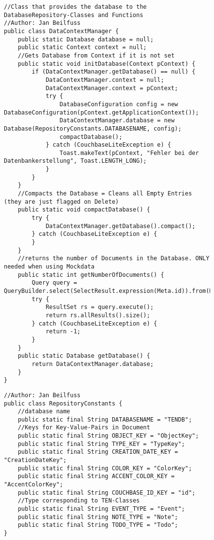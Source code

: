 \begin{figure}[H]
\begin{lstlisting}[caption=DataContextManager (Jan Beilfuß)]
//Class that provides the database to the DatabaseRepository-Classes and Functions
//Author: Jan Beilfuss
public class DataContextManager {
    public static Database database = null;
    public static Context context = null;
    //Gets Database from Context if it is not set
    public static void initDatabase(Context pContext) {
        if (DataContextManager.getDatabase() == null) {
            DataContextManager.context = null;
            DataContextManager.context = pContext;
            try {
                DatabaseConfiguration config = new DatabaseConfiguration(pContext.getApplicationContext());
                DataContextManager.database = new Database(RepositoryConstants.DATABASENAME, config);
                compactDatabase();
            } catch (CouchbaseLiteException e) {
                Toast.makeText(pContext, "Fehler bei der Datenbankerstellung", Toast.LENGTH_LONG);
            }
        }
    }
    //Compacts the Database = Cleans all Empty Entries (they are just flagged on Delete)
    public static void compactDatabase() {
        try {
            DataContextManager.getDatabase().compact();
        } catch (CouchbaseLiteException e) {
        }
    }
    //returns the number of Documents in the Database. ONLY needed when using Mockdata
    public static int getNumberOfDocuments() {
        Query query = QueryBuilder.select(SelectResult.expression(Meta.id)).from(DataSource.database(DataContextManager.getDatabase()));
        try {
            ResultSet rs = query.execute();
            return rs.allResults().size();
        } catch (CouchbaseLiteException e) {
            return -1;
        }
    }
    public static Database getDatabase() {
        return DataContextManager.database;
    }
}
\end{lstlisting}
\end{figure}

\begin{figure}[H]
\begin{lstlisting}[caption=RepositoryConstants (Jan Beilfuß)]
//Author: Jan Beilfuss
public class RepositoryConstants {
    //database name
    public static final String DATABASENAME = "TENDB";
    //Keys for Key-Value-Pairs in Document
    public static final String OBJECT_KEY = "ObjectKey";
    public static final String TYPE_KEY = "TypeKey";
    public static final String CREATION_DATE_KEY = "CreationDateKey";
    public static final String COLOR_KEY = "ColorKey";
    public static final String ACCENT_COLOR_KEY = "AccentColorKey";
    public static final String COUCHBASE_ID_KEY = "id";
    //Type corresponding to TEN-Classes
    public static final String EVENT_TYPE = "Event";
    public static final String NOTE_TYPE = "Note";
    public static final String TODO_TYPE = "Todo";
}
\end{lstlisting}
\end{figure}
